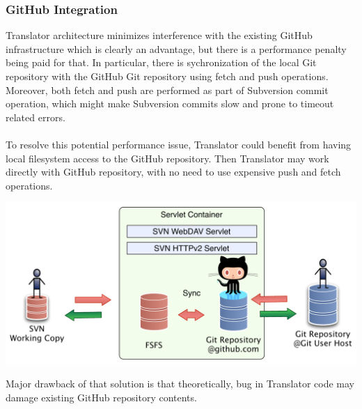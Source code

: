 \subsubsection{GitHub Integration}

Translator architecture minimizes interference with the existing GitHub infrastructure which is clearly an advantage, but there is a performance penalty being paid for that.
In particular, there is sychronization of the local Git repository with the GitHub Git repository using fetch and push operations. Moreover, both fetch and push are 
performed as part of Subversion commit operation, which might make Subversion commits slow and prone to timeout related errors.
\\\\
To resolve this potential performance issue, Translator could benefit from having local filesystem access to the GitHub repository. Then Translator may work directly with GitHub repository,
with no need to use expensive push and fetch operations.
\begin{center}
\includegraphics[width=\textwidth]{img/servlet/components_not_that_safe.pdf}%
\label{translator_components_pic2}%
\end{center}

Major drawback of that solution is that theoretically, bug in Translator code may damage existing GitHub repository contents.